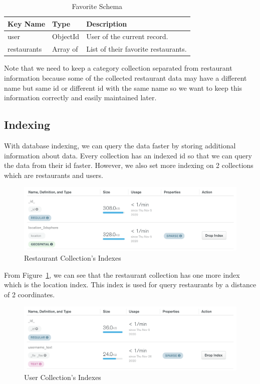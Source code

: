 \documentclass[12pt,oneside,openright,a4paper]{cpe-english-project}
\begin{document}
\begin{table}[H]
\caption{Favorite Schema}\label{tbl:3FavoriteSchema}
\begin{tabularx}{\textwidth}{l|l|X} \hline\hline
Key Name & Type & Description \\ \hline\hline
user & ObjectId & User of the current record. \\ \hline
restaurants & Array of & List of their favorite restaurants. \\ \hline\hline
\end{tabularx}
\end{table}

Note that we need to keep a category collection separated from restaurant information because some of the collected restaurant data may have a different name but same id or different id with the same name so we want to keep this information correctly and easily maintained later.


\subsection{Indexing}

With database indexing, we can query the data faster by storing additional information about data. Every collection has an indexed id so that we can query the data from their id faster. However, we also set more indexing on 2 collections which are restaurants and users.

\begin{figure}[H]\centering
\includegraphics[width=400pt]{./images/3db_RestaurantCollectionsIndexes.png}
\caption{Restaurant Collection’s Indexes}\label{fig:3db_RestaurantCollectionsIndexes}
\end{figure}

From Figure~\ref{fig:3db_RestaurantCollectionsIndexes}, we can see that the restaurant collection has one more index which is the location index. This index is used for query restaurants by a distance of 2 coordinates.
\begin{figure}[H]\centering
\includegraphics[width=400pt]{./images/3db_UserCollectionsIndexes.png}
\caption{User Collection’s Indexes}\label{fig:3db_UserCollectionsIndexes}
\end{figure}
\end{document}
